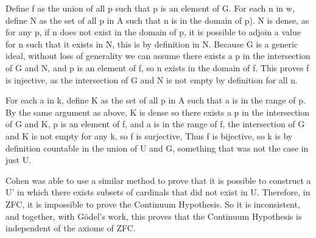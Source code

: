\documentclass[12pt]{article}
\theoremstyle{definition}
\begin{document}
Define f as the union of all p such that p is an element of G. For each n in w, define N as the set of all p in A such that n is in the domain of p). N is dense, as for any p, if n does not exist in the domain of p, it is possible to adjoin a value for n such that it exists in N, this is by definition in N. Because G is a generic ideal, without loss of generality we can assume there exists a p in the intersection of G and N, and p is an element of f, so n exists in the domain of f. This proves f is injective, as the intersection of G and N is not empty by definition for all n.

For each a in k, define K as the set of all p in A such that a is in the range of p. By the same argument as above, K is dense so there exists a p in the intersection of G and K, p is an element of f, and a is in the range of f, the intersection of G and K is not empty for any k, so f is surjective, Thus f is bijective, so k is by definition countable in the union of U and G, something that was not the case in just U.

Cohen was able to use a similar method to prove that it is possible to construct a U' in which there exists subsets of cardinals that did not exist in U. Therefore, in ZFC, it is impossible to prove the Continuum Hypothesis. So it is inconsistent, and together, with Gödel's work, this proves that the Continuum Hypothesis is independent of the axioms of ZFC.
\end{document}
